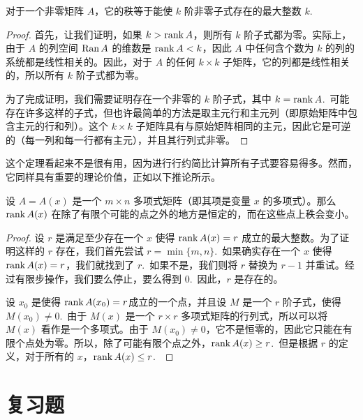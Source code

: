 \begin{theorem}\label{stmt:03-06-01} 对于一个非零矩阵 $A$，它的秩等于能使 $k$ 阶非零子式存在的最大整数 $k$.~\end{theorem}

\begin{proof} 首先，让我们证明，如果 $k > \operatorname{rank} A$，则所有 $k$ 阶子式都为零。实际上，由于 $A$ 的列空间 $\operatorname{Ran} A$ 的维数是 $\operatorname{rank} A < k$，因此 $A$ 中任何含个数为 $k$ 的列的系统都是线性相关的。因此，对于 $A$ 的任何 $k \times k$ 子矩阵，它的列都是线性相关的，所以所有 $k$ 阶子式都为零。

为了完成证明，我们需要证明存在一个非零的 $k$ 阶子式，其中 $k = \operatorname{rank} A$.~可能存在许多这样的子式，但也许最简单的方法是取主元行和主元列（即原始矩阵中包含主元的行和列）。这个 $k \times k$ 子矩阵具有与原始矩阵相同的主元，因此它是可逆的（每一列和每一行都有主元），并且其行列式非零。\end{proof}

这个定理看起来不是很有用，因为进行行约简比计算所有子式要容易得多。然而，它同样具有重要的理论价值，正如以下推论所示。

\begin{corollary}\label{stmt:03-06-02}
设 $A=A(x)$ 是一个 $m \times n$ 多项式矩阵（即其项是变量 $x$ 的多项式）。那么 $\operatorname{rank} A(x)$ 在除了有限个可能的点之外的地方是恒定的，而在这些点上秩会变小。
\end{corollary}

\begin{proof} 设 $r$ 是满足至少存在一个 $x$ 使得 $\operatorname{rank} A(x) = r$ 成立的最大整数。为了证明这样的 $r$ 存在，我们首先尝试 $r = \min\{m, n\}$.~如果确实存在一个 $x$ 使得 $\operatorname{rank} A(x) = r$，我们就找到了 $r$.~如果不是，我们则将 $r$ 替换为 $r-1$ 并重试。经过有限步操作，我们要么停止，要么得到 $0$.~因此，$r$ 是存在的。

设 $x_0$ 是使得 $\operatorname{rank} A(x_0) = r$成立的一个点，并且设 $M$ 是一个 $r$ 阶子式，使得 $M(x_0) \neq 0$.~由于 $M(x)$ 是一个 $r \times r$ 多项式矩阵的行列式，所以可以将 $M(x)$ 看作是一个多项式。由于 $M(x_0) \neq 0$，它不是恒零的，因此它只能在有限个点处为零。所以，除了可能有限个点之外，$\operatorname{rank} A(x) \geq r$.~但是根据 $r$ 的定义，对于所有的 $x$，$\operatorname{rank} A(x) \leq r$.~\end{proof}


\section{复习题}\label{sec:03-07}

